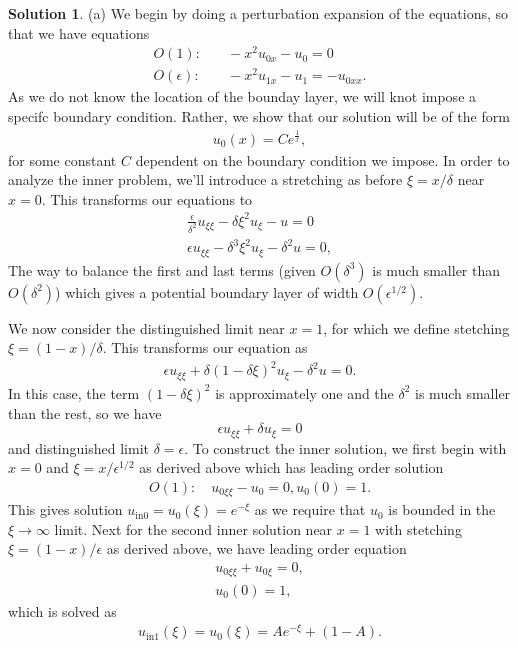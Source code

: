 \documentclass[12pt]{article}
\theoremstyle{definition}
\newtheorem{sol}{Solution}
\theoremstyle{remark}
\begin{document}
\begin{sol}
    (a) We begin by doing a perturbation expansion of the equations, so that we have equations
    \begin{align*}
        O(1): &\quad -x^{2} u_{0x} - u_{0} = 0\\
        O(\epsilon): &\quad - x^{2} u_{1x} - u_{1} = - u_{0xx}.
    \end{align*}
    As we do not know the location of the bounday layer, we will knot impose a specifc boundary condition. Rather, we show that our solution will be of the form 
    \begin{align*}
        u_{0}(x) = C e^{\frac{1}{x}},
    \end{align*}
    for some constant $C$ dependent on the boundary condition we impose. In order to analyze the inner problem, we'll introduce a stretching as before $\xi = x / \delta$ near $x=0$. This transforms our equations to 
    \begin{align*}
    \frac{\epsilon}{\delta^{2}} u_{\xi \xi} - \delta \xi^{2} u_{\xi} - u = 0\\
    \epsilon u_{\xi \xi} - \delta^{3} \xi^{2} u_{\xi} - \delta^{2} u = 0,
    \end{align*}
    The way to balance the first and last terms (given $O(\delta^{3})$ is much smaller than $O(\delta^{2})$) which gives a potential boundary layer of width $O(\epsilon^{1 / 2})$. 

    We now consider the distinguished limit near $x=1$, for which we define stetching $\xi = (1 - x) / \delta$. This transforms our equation as
    \begin{align*}
        \epsilon u_{\xi \xi} + \delta ( 1 - \delta \xi )^{2} u_{\xi} - \delta^{2} u = 0.
    \end{align*}
    In this case, the term $(1 - \delta \xi)^{2}$ is approximately one and the $\delta^{2}$ is much smaller than the rest, so we have 
\begin{equation*}
    \epsilon u_{\xi \xi} + \delta u_{\xi} = 0
\end{equation*}
and distinguished limit $\delta = \epsilon$. To construct the inner solution, we first begin with  $x = 0$ and $\xi = x / \epsilon^{1 / 2}$ as derived above which has leading order solution
\begin{align*}
    O(1): \quad u_{0\xi \xi} - u_{0} = 0, u_{0}(0) = 1.
\end{align*}
This gives solution $ u_{\text{in}0} = u_{0}(\xi) = e^{- \xi}$ as we require that $u_{0}$ is bounded in the $\xi \to \infty$ limit. Next for the second inner solution near $x = 1$ with stetching $\xi = (1 - x) / \epsilon$ as derived above, we have leading order equation
\begin{align*}
u_{0\xi \xi}  + u_{0\xi} = 0,\\
u_{0}(0) = 1, 
\end{align*}
which is solved as
\begin{align*}
    u_{\text{in}1}(\xi) = u_{0}(\xi) =  A e^{-\xi} + (1 - A).
\end{align*}
 

\end{sol}
\end{document}
